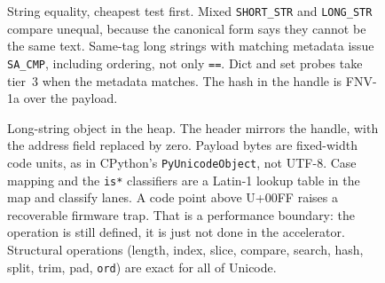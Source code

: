 \begin{figure}[htbp]
\centering
{}
\caption{String equality, cheapest test first.
Mixed \texttt{SHORT\_STR} and \texttt{LONG\_STR} compare unequal, because the canonical form says they cannot be the same text.
Same-tag long strings with matching metadata issue \texttt{SA\_CMP}, including ordering, not only \texttt{==}.
Dict and set probes take tier~3 when the metadata matches.
The hash in the handle is FNV-1a over the payload.}
\label{fig:streq}
\end{figure}

\begin{figure}[htbp]
\centering
{}
\caption{Long-string object in the heap.
The header mirrors the handle, with the address field replaced by zero.
Payload bytes are fixed-width code units, as in CPython's \texttt{PyUnicodeObject}, not UTF-8.
Case mapping and the \texttt{is*} classifiers are a Latin-1 lookup table in the map and classify lanes.
A code point above U+00FF raises a recoverable firmware trap.
That is a performance boundary: the operation is still defined, it is just not done in the accelerator.
Structural operations (length, index, slice, compare, search, hash, split, trim, pad, \texttt{ord}) are exact for all of Unicode.}
\label{fig:strobj}
\end{figure}
